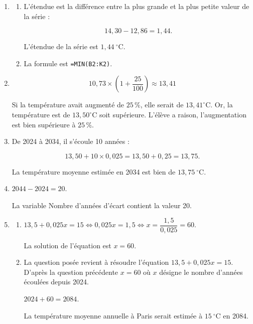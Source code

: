 \begin{enumerate}
	\item
	\begin{enumerate}
		\item L'étendue est la différence entre la plus grande et la plus petite valeur de la série :

\[14,30 - 12,86 = 1,44.\]

L'étendue de la série est $1,44~^{\circ}$C.

		\item La formule est \texttt{=MIN(B2:K2)}.
	\end{enumerate}

	\item

\[10,73 \times \left(1 + \frac{25}{100}\right) \approx 13,41 \]
	
Si la température avait augmenté de $25\,\%$, elle serait de $13,41^{\circ}$C. Or, la température est de $13,50^{\circ}$C soit supérieure. L'élève a raison, l'augmentation est bien supérieure à $25\,\%$.

	\item De 2024 à 2034, il s'écoule 10 années :

\[13,50 + 10\times 0,025 = 13,50 + 0,25 = 13,75.\]

La température moyenne estimée en 2034 est bien de $13,75~^{\circ}$C.

	\item $2044 - 2024 = 20$.
	
La variable \og Nombre d'années d'écart \fg{} contient la valeur 20.
	\item
	\begin{enumerate}
		\item $13,5 +  0,025x = 15 \iff 0,025x = 1,5 \iff x = \dfrac{1,5}{0,025}=60$.
		
La solution de l'équation est $x = 60$.
		\item La question posée revient à résoudre l'équation $13,5+0,025x = 15$. D'après la question précédente $x = 60$ où $x$ désigne le nombre d'années écoulées depuis 2024.

$2024 + 60 = 2084$.

La température moyenne annuelle à Paris serait estimée à $15~^{\circ}$C en 2084.
	\end{enumerate}
\end{enumerate}
